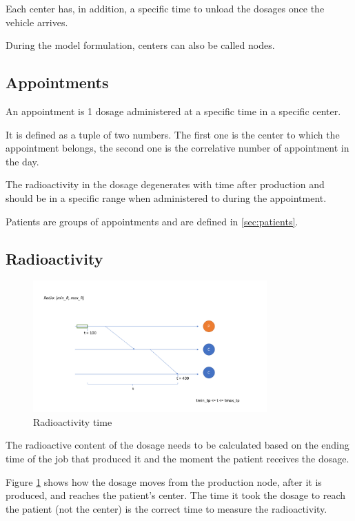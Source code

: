 Each center has, in addition, a specific time to unload the dosages once the vehicle arrives.

During the model formulation, centers can also be called nodes.

\subsection{Appointments}

An appointment is 1 dosage administered at a specific time in a specific center.

It is defined as a tuple of two numbers. The first one is the center to which the appointment belongs, the second one is the correlative number of appointment in the day.

The radioactivity in the dosage degenerates with time after production and should be in a specific range when administered to during the appointment.

Patients are groups of appointments and are defined in \ref{sec:patients}.

\subsection{Radioactivity}

\begin{figure}
	\centering
	
		\includegraphics[width=0.80\textwidth]{imagenes/radioactivity.png}
	\caption{Radioactivity time}
	\label{fig:radioactivity}
\end{figure}


The radioactive content of the dosage needs to be calculated based on the ending time of the job that produced it and the moment the patient receives the dosage.

Figure \ref{fig:radioactivity} shows how the dosage moves from the production node, after it is produced, and reaches the patient's center. The time it took the dosage to reach the patient (not the center) is the correct time to measure the radioactivity.

